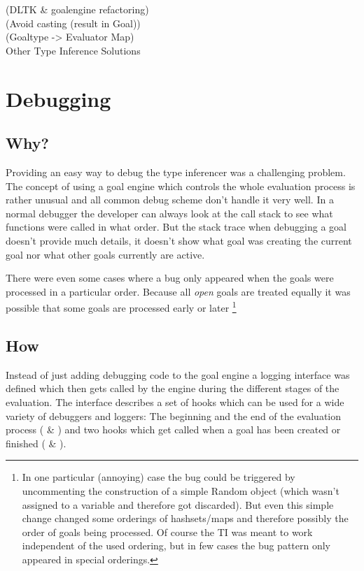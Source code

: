 \documentclass[12pt,halfparskip,DIV11,BCOR10mm]{scrreprt}
\begin{document}
 (DLTK \& goalengine refactoring) \\
 (Avoid casting (result in Goal))\\
 (Goaltype -> Evaluator Map)\\
Other Type Inference Solutions


\section{Debugging}

\subsection{Why?}

Providing an easy way to debug the type inferencer was a challenging problem. The concept of using a goal engine which controls the whole evaluation process is rather unusual and all common debug scheme don't handle it very well. In a normal debugger the developer can always look at the call stack to see what functions were called in what order. But the stack trace when debugging a goal doesn't provide much details, it doesn't show what goal was creating the current goal nor what other goals currently are active.

There were even some cases where a bug only appeared when the goals were processed in a particular order. Because all \emph{open} goals are treated equally it was possible that some goals are processed early or later
\footnote{In one particular (annoying) case the bug could be triggered by uncommenting the construction of a simple Random object (which wasn't assigned to a variable and therefore got discarded). But even this simple change changed some orderings of hashsets/maps and therefore possibly the order of goals being processed. Of course the TI was meant to work independent of the used ordering, but in few cases the bug pattern only appeared in special orderings.}

\subsection{How}


Instead of just adding debugging code to the goal engine a logging interface was defined which then gets called by the engine during the different stages of the evaluation. The interface  describes a set of hooks which can be used for a wide variety of debuggers and loggers: The beginning and the end of the evaluation process ( \& ) and two hooks which get called when a goal has been created or finished ( \& ).
\end{document}
